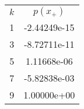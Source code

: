 \begin{tabular}{cc}
\hline
 $k$ & $p(x_+)$ \\
1 &-2.44249e-15\\
3 &-8.72711e-11\\
5 &1.11668e-06\\
7 &-5.82838e-03\\
9 &1.00000e+00\\
\hline
\end{tabular}
